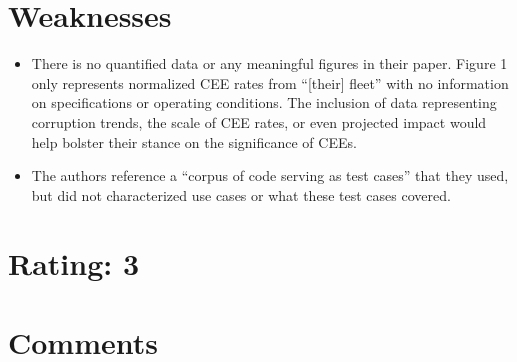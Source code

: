 \documentclass [12pt]{article}
\begin{document}
    \section{Weaknesses} %
    \label{sec:weaknesses}
        \begin{itemize}
            \item There is no quantified data or any meaningful figures in their paper. Figure 1 only represents normalized CEE rates from ``[their] fleet'' with no information on specifications or operating conditions. The inclusion of data representing corruption trends, the scale of CEE rates, or even projected impact would help bolster their stance on the significance of CEEs. 
            
            \item The authors reference a ``corpus of code serving as test cases'' that they used, but did not characterized use cases or what these test cases covered. 
            
    
        \end{itemize}

    \section{Rating: 3} %
    \label{sec:rating}
    \pagebreak

    \section{Comments} %
    \label{sec:comments}

    
\end{document}
